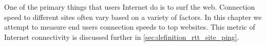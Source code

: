 One of the primary things that users Internet do is to surf the web. Connection speed to different sites often vary based on a variety of factors. In this chapter we attempt to measure end users connection speeds to top websites. This metric of Internet connectivity is discussed further in \cref{sec:definition_rtt_site_ping}.